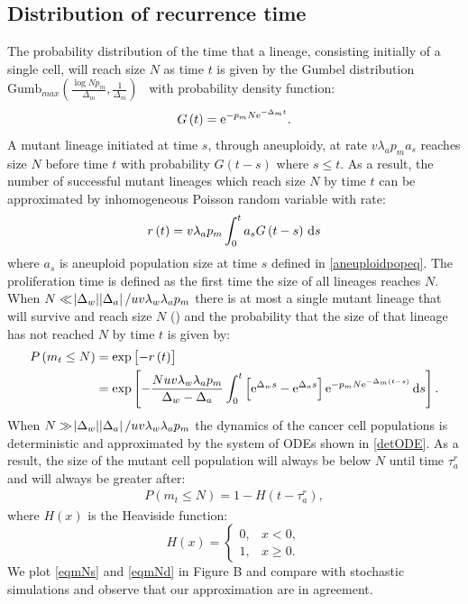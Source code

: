 \documentclass[12pt]{extarticle}
\renewcommand{\d}[1]{\ensuremath{\operatorname{d}\!{#1}}}
\renewcommand{\d}{{\rm d}}
\newcommand{\e}{{\rm e}}
\begin{document}
\begin{appendices}
\section{Distribution of recurrence time}
The probability distribution of the time that a lineage, consisting initially of a single cell, will reach size $N$ as time $t$ is given by the Gumbel distribution $\text{Gumb}_{max}\left(\frac{\log Np_m}{\Delta_m},\frac{1}{\Delta_m}\right)$~\citep{avanzini2019cancer} with probability density function:
\begin{align*}
G\left(t\right)=\e^{-p_mN\e^{-\Delta_mt}}.
\end{align*}
A mutant lineage initiated at time $s$, through aneuploidy, at rate $v\lambda_ap_ma_s$ reaches size $N$ before time $t$ with probability $G\left(t-s\right)$ where $s\leq t$. As a result, the number of successful mutant lineages which reach size $N$ by time $t$ can be approximated by inhomogeneous Poisson random variable with rate:
\begin{align*}
r\left(t\right)=v\lambda_ap_m\int_0^t a_sG\left(t-s\right)\,\d s
\end{align*}
where $a_s$ is aneuploid population size at time $s$ defined in \cref{aneuploidpopeq}. The proliferation time is defined as the first time the size of all lineages reaches $N$. When $N\ll\abs{\Delta_w}\abs{\Delta_a}/uv\lambda_w\lambda_ap_m$ there is at most a single mutant lineage that will survive and reach size $N$ () and the probability that the size of that lineage has not reached $N$ by time $t$ is given by:
\begin{align}\nonumber
P\left(m_t\leq N\right)&=\exp\left[-r\left(t\right)\right]\\ \label{eqmNs}
&=\exp\left[-\frac{Nuv\lambda_w\lambda_ap_m}{\Delta_w-\Delta_a}\int_0^t\left[\e^{\Delta_ws}-\e^{\Delta_as}\right]\e^{-p_mN\e^{-\Delta_m\left(t-s\right)}}\,\d s\right].
\end{align}
When $N\gg\abs{\Delta_w}\abs{\Delta_a}/uv\lambda_w\lambda_ap_m$ the dynamics of the cancer cell populations is deterministic and approximated by the system of ODEs shown in \cref{detODE}. As a result, the size of the mutant cell population will always be below $N$ until time $\tau_a^r$ and will always be greater after:
\begin{align}\label{eqmNd}
P\left(m_t\leq N\right)=1-H\left(t-\tau_a^r\right),
\end{align}
where $H(x)$ is the Heaviside function:
\begin{equation*}
H\left(x\right) = \begin{cases}
    0 ,&
  x<0 ,\\ 
  1 ,&
  x\geq0 .
  \end{cases}
\end{equation*}
We plot \cref{eqmNs} and \cref{eqmNd} in Figure B and compare with stochastic simulations and observe that our approximation are in agreement. 


\end{appendices}
\end{document}

